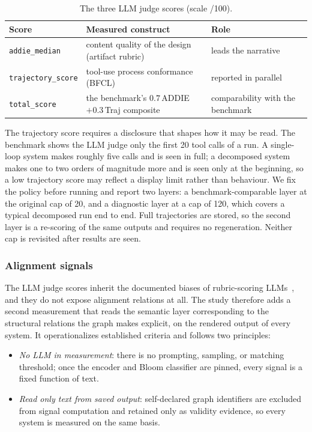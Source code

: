 \begin{table}[t]
  \caption{The three LLM judge scores (scale /100).}
  \label{tab:llm-judge-scores}
  \small
  \begin{tabular}{@{}lp{}p{}@{}}
    \toprule
    Score & Measured construct & Role \\
    \midrule
    \texttt{addie\_median} & content quality of the design (artifact rubric) &
    leads the narrative \\
    \texttt{trajectory\_score} & tool-use process conformance (BFCL) &
    reported in parallel \\
    \texttt{total\_score} & the benchmark's $0.7\,$ADDIE$+0.3\,$Traj composite &
    comparability with the benchmark \\
    \bottomrule
  \end{tabular}
\end{table}

The trajectory score requires a disclosure that shapes how it may be read. The
benchmark shows the LLM judge only the first 20 tool calls of a run. A single-loop system
makes roughly five calls and is seen in full; a decomposed system makes one to two
orders of magnitude more and is seen only at the beginning, so a low trajectory score
may reflect a display limit rather than behaviour. We fix the policy before running
and report two layers: a benchmark-comparable layer at the original cap of 20, and a
diagnostic layer at a cap of 120, which covers a typical decomposed run end to end.
Full trajectories are stored, so the second layer is a re-scoring of the same
outputs and requires no regeneration. Neither cap is revisited after results are
seen.

\subsubsection{Alignment signals}
\label{sec:alignment-measures}

The LLM judge scores inherit the documented biases of rubric-scoring
LLMs~\cite{zheng2023judging,panickssery2024llm,norman2026reliability}, and they do
not expose alignment relations at all. The study therefore adds a second measurement
that reads the semantic layer corresponding to the structural relations the graph
makes explicit, on the rendered output of every system. It operationalizes
established criteria and follows two principles:
\begin{itemize}
  \item \emph{No LLM in measurement}: there is no prompting, sampling, or matching
  threshold; once the encoder and Bloom classifier are pinned, every signal is a
  fixed function of text.
  \item \emph{Read only text from saved output}: self-declared graph identifiers are
  excluded from signal computation and retained only as validity evidence, so every
  system is measured on the same basis.
\end{itemize}

